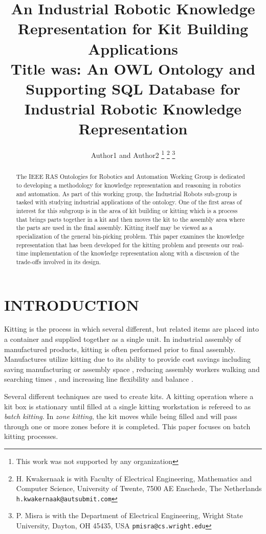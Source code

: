 \documentclass[a4paper, 10pt, conference]{ieeeconf}      %
\title{\LARGE \bf
An  Industrial Robotic Knowledge Representation for Kit Building Applications\\
Title was: An OWL Ontology and Supporting SQL Database for Industrial Robotic Knowledge Representation
}
\author{Author1 and Author2%
\thanks{This work was not supported by any organization}%
\thanks{H. Kwakernaak is with Faculty of Electrical Engineering, Mathematics and Computer Science,
        University of Twente, 7500 AE Enschede, The Netherlands
        {\tt\small h.kwakernaak@autsubmit.com}}%
\thanks{P. Misra is with the Department of Electrical Engineering, Wright State University,
        Dayton, OH 45435, USA
        {\tt\small pmisra@cs.wright.edu}}%
}
\begin{document}
\maketitle
\thispagestyle{empty}
\pagestyle{empty}


\begin{abstract}

The IEEE RAS Ontologies for Robotics and Automation Working Group is dedicated to developing a methodology for knowledge representation and reasoning in robotics and automation. As part of this working group, the Industrial Robots sub-group is tasked with studying industrial applications of the ontology. One of the first areas of interest for this subgroup is in the area of kit building or kitting which is a process that brings parts together in a kit and then moves the kit to the assembly area where the parts are used in the final assembly. Kitting itself may be viewed as a specialization of the general bin-picking problem. This paper examines the knowledge representation that has been developed for the kitting problem and presents our real-time implementation of the knowledge representation along with a discussion of the trade-offs involved in its design.

\end{abstract}


\section{INTRODUCTION}
Kitting is the process in which several different, but related items are placed into a container and supplied together as a single unit.
In industrial assembly of manufactured products, kitting is often performed prior to final assembly. Manufactures utilize kitting
due to its ability to provide cost savings \cite{Carlsson_2008} including saving manufacturing or assembly space \cite{Medbo2003}, reducing assembly workers walking and searching times \cite{Schwind1992}, and increasing line flexibility \cite{Bozer1992} and balance \cite{Jiao2000}.

Several different techniques are used to create kits. A kitting operation where a kit box is stationary until filled at a single
kitting workstation is refereed to as {\it batch kitting}. In {\it zone kitting}, the kit moves while being filled and will pass through one or
more zones before it is completed. This paper focuses on batch kitting processes.
\end{document}
